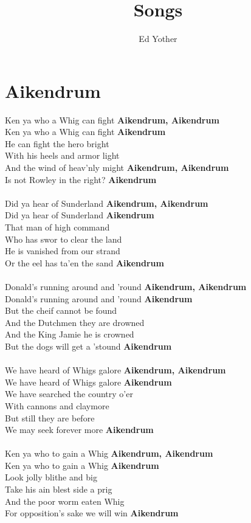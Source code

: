 \documentclass[letterpaper,9pt]{article}
\title{Songs}
\author{Ed Yother}
\begin{document}
\maketitle

\tableofcontents

\newpage
\section{Aikendrum}
\Large
\noindent
Ken ya who a Whig can fight \textbf{Aikendrum, Aikendrum}
\\Ken ya who a Whig can fight \textbf{Aikendrum}
\\He can fight the hero bright
\\With his heels and armor light
\\And the wind of heav'nly might \textbf{Aikendrum, Aikendrum}
\\Is not Rowley in the right? \textbf{Aikendrum}
\\
\\Did ya hear of Sunderland \textbf{Aikendrum, Aikendrum} 
\\Did ya hear of Sunderland \textbf{Aikendrum}
\\That man of high command
\\Who has swor to clear the land
\\He is vanished from our strand
\\Or the eel has ta'en the sand \textbf{Aikendrum}
\\
\\Donald's running around and 'round \textbf{Aikendrum, Aikendrum}
\\Donald's running around and 'round \textbf{Aikendrum}
\\But the cheif cannot be found
\\And the Dutchmen they are drowned
\\And the King Jamie he is crowned
\\But the dogs will get a 'stound \textbf{Aikendrum}
\\
\\We have heard of Whigs galore \textbf{Aikendrum, Aikendrum}
\\We have heard of Whigs galore \textbf{Aikendrum}
\\We have searched the country o'er
\\With cannons and claymore
\\But still they are before
\\We may seek forever more \textbf{Aikendrum}
\\
\\Ken ya who to gain a Whig \textbf{Aikendrum, Aikendrum}
\\Ken ya who to gain a Whig \textbf{Aikendrum}
\\Look jolly blithe and big
\\Take his ain blest side a prig
\\And the poor worm eaten Whig
\\For opposition's sake we will win \textbf{Aikendrum}
\end{document}
